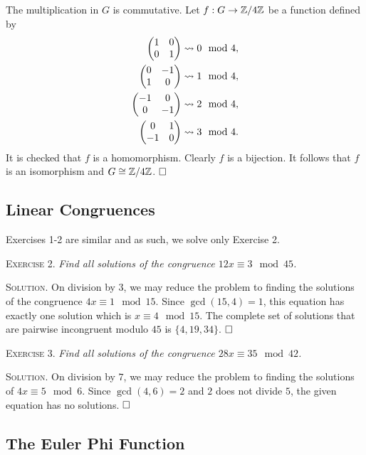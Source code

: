 \documentclass[11pt, leqno]{article}
\newcommand{\done}{\ensuremath{\hfill\square}}
\begin{document}
The multiplication in $G$ is commutative. Let $f: G \to \mathbb{Z}/4\mathbb{Z}$ be a function defined by 
\begin{align*}
  \begin{pmatrix} 1 & 0 \\ 0 & 1 \end{pmatrix} &\rightsquigarrow 0 \mod 4, \\
  \begin{pmatrix} 0 & -1 \\ 1 & 0 \end{pmatrix} &\rightsquigarrow 1 \mod 4, \\
  \begin{pmatrix} -1 & 0 \\ 0 & -1 \end{pmatrix} &\rightsquigarrow 2 \mod 4, \\
  \begin{pmatrix} 0 & 1 \\ -1 & 0 \end{pmatrix} &\rightsquigarrow 3 \mod 4.
\end{align*}
It is checked that $f$ is a homomorphism. Clearly $f$ is a bijection. It follows that $f$ is an isomorphism and $G \cong \mathbb{Z}/4\mathbb{Z}$. \done

\subsection{Linear Congruences}

Exercises 1-2 are similar and as such, we solve only Exercise 2.

\textsc{Exercise 2}. \emph{Find all solutions of the congruence $12x \equiv 3 \mod 45$.}

\textsc{Solution}. On division by $3$, we may reduce the problem to finding the solutions of the congruence $4x \equiv 1 \mod 15$. Since $\gcd(15,4) =1$, this equation has exactly one solution which is $x\equiv 4 \mod 15$. The complete set of solutions that are pairwise incongruent modulo $45$ is $\{ 4, 19, 34 \}$. \done

\textsc{Exercise 3}. \emph{Find all solutions of the congruence $28x \equiv 35 \mod 42$.}

\textsc{Solution}. On division by $7$, we may reduce the problem to finding the solutions of $4x \equiv 5 \mod 6$. Since $\gcd(4,6) = 2$ and $2$ does not divide $5$, the given equation has no solutions. \done

\subsection{The Euler Phi Function}
\end{document}
